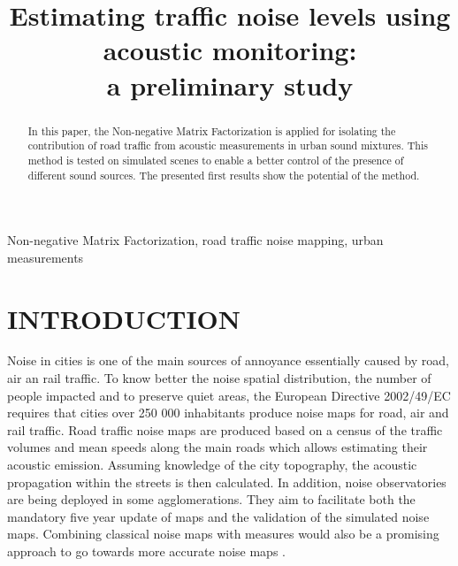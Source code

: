 \documentclass{article}
\title{Estimating traffic noise levels using acoustic monitoring: \\ a preliminary study}
\begin{document}
\maketitle

\begin{sloppy}

\begin{abstract}
In this paper, the Non-negative Matrix Factorization is applied for isolating the contribution of road traffic from acoustic measurements in urban sound mixtures. This method is tested on simulated scenes to enable a better control of the presence of different sound sources. The presented first results show the potential of the method.
\end{abstract}

\begin{keywords}
Non-negative Matrix Factorization, road traffic noise mapping, urban measurements
\end{keywords}

\section{INTRODUCTION}
\label{sec:motivations}

Noise in cities is one of the main sources of annoyance essentially caused by road, air an rail traffic. To know better the noise spatial distribution, the number of people impacted and to preserve quiet areas, the European Directive 2002/49/EC \cite{directive} requires that cities over 250 000 inhabitants produce noise maps for road, air and rail traffic. Road traffic noise maps are produced based on a census of the traffic volumes and mean speeds along the main roads which allows estimating their acoustic emission. Assuming knowledge of the city topography, the acoustic propagation within the streets is then calculated. In addition, noise observatories are being deployed in some agglomerations. They aim to facilitate both the mandatory five year update of maps and the validation of the simulated noise maps. Combining classical noise maps with measures would also be a promising approach to go towards more accurate noise maps \cite{Can} \cite{deCoensel}.



\end{sloppy}
\end{document}
